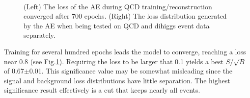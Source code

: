 \begin{figure}[!h] 
  \begin{center}
    \\
    \caption{(Left) The loss of the AE during QCD training/reconstruction converged after 700 epochs. (Right) The loss distribution generated by the AE when being tested on QCD and dihiggs event data separately.}    
  \label{fig:ae_trainPredLoss}
\end{center}
\end{figure}

Training for several hundred epochs leads the model to converge, reaching a loss near 0.8 (see Fig.\ref{fig:ae_trainPredLoss}). Requiring the loss to be larger that 0.1 yields a best $S/\sqrt{B}$ of 0.67$\pm$0.01. This significance value may be somewhat misleading since the signal and background loss distributions have little separation. The highest significance result effectively is a cut that keeps nearly all events. 

